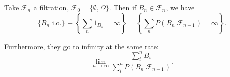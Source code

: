\begin{theorem}
	Take $\mathcal{F}_n$ a filtration, $\mathcal{F}_0 = \{\emptyset , \Omega\} $. Then if $B_n \in \mathcal{F}_n$, we have
	\[
		\{B_n \text{ i.o.}\} \equiv \left\{ \sum_n 1_{B_n} = \infty  \right\}  = \left\{\sum_n P\left(B_n | \mathcal{F}_{n-1}\right)  = \infty \right\} 
	.\] 

	Furthermore, they go to infinity at the same rate:
	\[
		\lim_{n \to \infty }
		\frac{\sum_i^n B_i}{\sum_i^n P\left( B_n | \mathcal{F}_{n-1} \right) }
	.\] 
\end{theorem}



